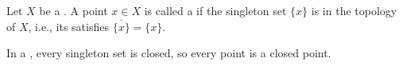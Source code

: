 \begin{definition} \label{definition:closed_point_of_a_topological_space}
    Let $X$ be a . A point $x \in X$ is called a  if the singleton set $\{x\}$ is  in the topology of $X$, i.e., its  satisfies $\overline{\{x\}} = \{x\}$.

    In a , every singleton set is closed, so every point is a closed point. 
\end{definition}
